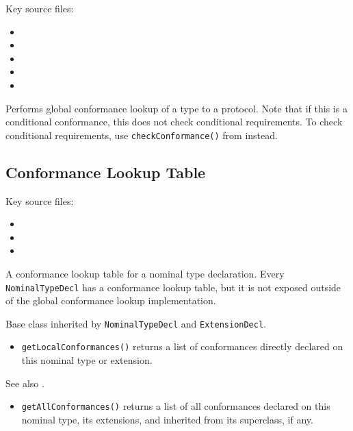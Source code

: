 \documentclass[../generics]{subfiles}
\begin{document}
Key source files:
\begin{itemize}
\item {}
\item {}
\item {}
\item {}
\item {}
\end{itemize}

Performs global conformance lookup of a type to a protocol. Note that if this is a conditional conformance, this does not check conditional requirements. To check conditional requirements, use \texttt{checkConformance()} from  instead.

\subsection*{Conformance Lookup Table}

Key source files:
\begin{itemize}
\item {}
\item {}
\item {}
\end{itemize}

A conformance lookup table for a nominal type declaration. Every \texttt{NominalTypeDecl} has a conformance lookup table, but it is not exposed outside of the global conformance lookup implementation.

Base class inherited by \texttt{NominalTypeDecl} and \texttt{ExtensionDecl}.
\begin{itemize}
\item \texttt{getLocalConformances()} returns a 
list of conformances directly declared on this nominal type or extension.
\end{itemize}

See also .
\begin{itemize}
\item \texttt{getAllConformances()} returns a list of all conformances declared on this nominal type, its extensions, and inherited from its superclass, if any.
\end{itemize}
\end{document}
